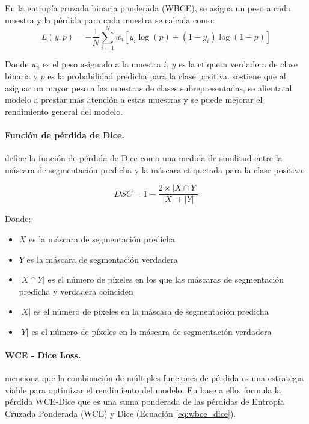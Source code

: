 En la entropía cruzada binaria ponderada (WBCE), se asigna un peso a cada muestra y la pérdida para cada muestra se calcula como:
\begin{equation}
    L(y, p) = -\frac{1}{N} \sum_{i=1}^{N} w_i[y_i \log(p) + (1 - y_i) \log(1 - p)]
    \label{eq:weighted_binary_cross_entropy}
\end{equation}

Donde $w_i$ es el peso asignado a la muestra $i$, $y$ es la etiqueta verdadera de clase binaria y $p$ es la probabilidad predicha para la clase positiva.
\citet{terven_loss_2024} sostiene que al asignar un mayor peso a las muestras de clases subrepresentadas, se alienta al modelo a prestar más atención a estas muestras y se puede mejorar el rendimiento general del modelo.

\paragraph{Función de pérdida de Dice.}
\citet{terven_loss_2024} define la función de pérdida de Dice como una medida de similitud entre la máscara de segmentación predicha y la máscara etiquetada para la clase positiva:

\begin{equation}
    DSC = 1 - \frac{2 \times |X \cap Y|}{|X| + |Y|}
    \label{eq:dice}
\end{equation}

Donde:
\begin{itemize}
    \item $X$ es la máscara de segmentación predicha
    \item $Y$ es la máscara de segmentación verdadera
    \item $|X \cap Y|$ es el número de píxeles en los que las máscaras de segmentación predicha y verdadera coinciden
    \item $|X|$ es el número de píxeles en la máscara de segmentación predicha
    \item $|Y|$ es el número de píxeles en la máscara de segmentación verdadera
\end{itemize}

\paragraph{WCE - Dice Loss.}
\citet{yali_evaluacion_2024} menciona que la combinación de múltiples funciones de pérdida es una estrategia viable para optimizar el rendimiento del modelo. 
En base a ello, formula la pérdida WCE-Dice que es una suma ponderada de las pérdidas 
de Entropía Cruzada Ponderada (WCE) y Dice (Ecuación \ref{eq:wbce_dice}).

